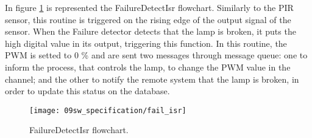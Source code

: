 In figure \ref{fig:fail_isr} is represented the FailureDetectIsr flowchart. Similarly to the PIR sensor, this routine is triggered on the rising edge of the output signal of the sensor. When the Failure detector detects that the lamp is broken, it puts the high digital value in its output, triggering this function. In this routine, the PWM is setted to 0 \% and are sent two messages through message queue: one to inform the process, that controls the lamp, to change the PWM value in the channel; and the other to notify the remote system that the lamp is broken, in order to update this status on the database.

\begin{figure}[H]
	\centering
	\texttt{[image: 09sw\_specification/fail\_isr]}
	\caption{FailureDetectIsr flowchart.}
	\label{fig:fail_isr}
\end{figure}

%

%
%
